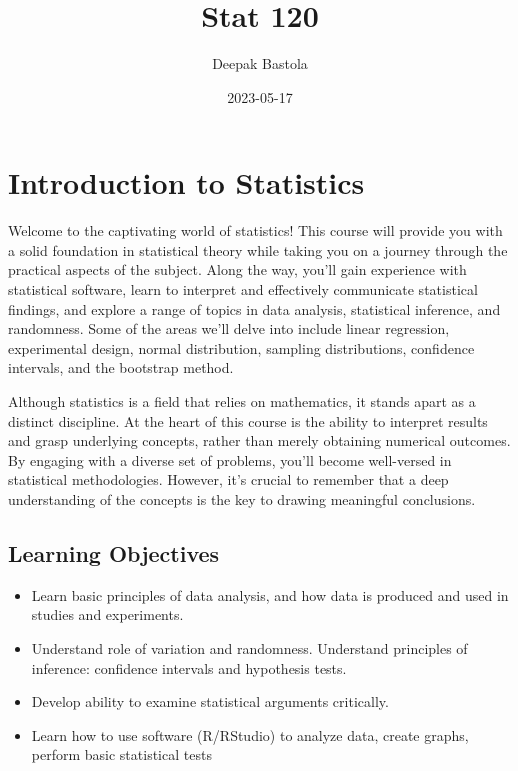 \documentclass[
]{book}
\title{Stat 120}
\author{Deepak Bastola}
\date{2023-05-17}
\begin{document}
\maketitle

{
\setcounter{tocdepth}{1}
\tableofcontents
}
\hypertarget{introduction-to-statistics}{%
\chapter*{Introduction to Statistics}\label{introduction-to-statistics}}

Welcome to the captivating world of statistics! This course will provide you with a solid foundation in statistical theory while taking you on a journey through the practical aspects of the subject. Along the way, you'll gain experience with statistical software, learn to interpret and effectively communicate statistical findings, and explore a range of topics in data analysis, statistical inference, and randomness. Some of the areas we'll delve into include linear regression, experimental design, normal distribution, sampling distributions, confidence intervals, and the bootstrap method.

Although statistics is a field that relies on mathematics, it stands apart as a distinct discipline. At the heart of this course is the ability to interpret results and grasp underlying concepts, rather than merely obtaining numerical outcomes. By engaging with a diverse set of problems, you'll become well-versed in statistical methodologies. However, it's crucial to remember that a deep understanding of the concepts is the key to drawing meaningful conclusions.

\hypertarget{learning-objectives}{%
\section{Learning Objectives}\label{learning-objectives}}

\begin{itemize}
\item
  Learn basic principles of data analysis, and how data is produced and used in studies and experiments.
\item
  Understand role of variation and randomness. Understand principles of inference: confidence intervals and hypothesis tests.
\item
  Develop ability to examine statistical arguments critically.
\item
  Learn how to use software (R/RStudio) to analyze data, create graphs, perform basic statistical tests
\end{itemize}
\end{document}
